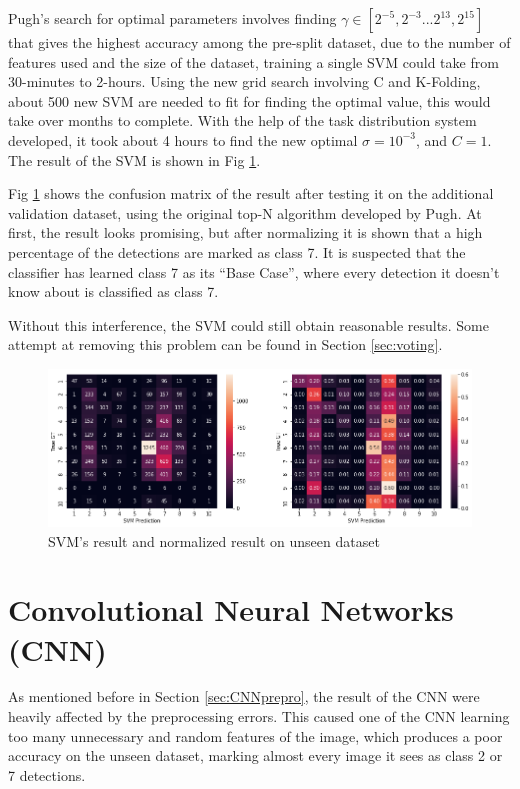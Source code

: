 \documentclass[bsc,logo,twoside,fullspacing,parskip]{infthesis}
\begin{document}
Pugh's search for optimal parameters involves finding \(\gamma\in[2^{-5},2^{-3}...2^{13},2^{15}]\) that gives the highest accuracy among the pre-split dataset, due to the number of features used and the size of the dataset, training a single SVM could take from 30-minutes to 2-hours. Using the new grid search involving C and K-Folding, about 500 new SVM are needed to fit for finding the optimal value, this would take over months to complete.
With the help of the task distribution system developed, it took about 4 hours to find the
new optimal \(\sigma = 10^{-3}\), and \(C = 1\).
The result of the SVM is shown in Fig \ref{fig:svmacc}.

Fig \ref{fig:svmacc} shows the confusion matrix of the result after testing it on the additional validation dataset, using the original top-N algorithm developed by Pugh\cite{Pugh}. 
At first, the result looks promising, but after normalizing it is shown that a high percentage of the detections are marked as class 7.
It is suspected that the classifier has learned class 7 as its ``Base Case'', where every detection it doesn't know about is classified as class 7.

Without this interference, the SVM could still obtain reasonable results.
Some attempt at removing this problem can be found in Section \ref{sec:voting}.

\begin{figure}[h]
\centering
    \includegraphics[scale=0.44]{graph/svmresult.png}
    \caption{SVM's result and normalized result on unseen dataset}
    \label{fig:svmacc}
\end{figure} 

\section{Convolutional Neural Networks (CNN)}
\label{sec:cnn}

As mentioned before in Section \ref{sec:CNNprepro}, the result of the CNN were heavily affected by the preprocessing errors. This caused one of the CNN learning too many unnecessary and random features of the image, which produces a poor accuracy on the unseen dataset, marking almost every image it sees as class 2 or 7 detections. 
\end{document}
